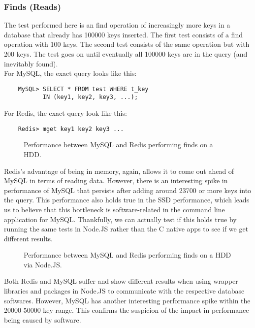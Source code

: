 \documentclass[letterpaper, 10 pt, conference]{ieeeconf}
\begin{document}
\subsubsection{Finds (Reads)}
The test performed here is an find operation of increasingly more keys in a database that already has 100000 keys inserted. The first test consists of a find operation with 100 keys. The second test consists of the same operation but with 200 keys. The test goes on until eventually all 100000 keys are in the query (and inevitably found). \\
For MySQL, the exact query looks like this:
\begin{verbatim}
    MySQL> SELECT * FROM test WHERE t_key
           IN (key1, key2, key3, ...);
\end{verbatim}
For Redis, the exact query look like this:
\begin{verbatim}
    Redis> mget key1 key2 key3 ...
\end{verbatim}
\begin{figure}[h]
    \centering
    
    \caption{Performance between MySQL and Redis performing finds on a HDD.}
    \label{fig:mesh1}
\end{figure}
Redis's advantage of being in memory, again, allows it to come out ahead of MySQL in terms of reading data. However, there is an interesting spike in performance of MySQL that persists after adding around 23700 or more keys into the query. This performance also holds true in the SSD performance, which leads us to believe that this bottleneck is software-related in the command line application for MySQL. Thankfully, we can actually test if this holds true by running the same tests in Node.JS rather than the C native apps to see if we get different results.
\begin{figure}[h]
    \centering
    
    \caption{Performance between MySQL and Redis performing finds on a HDD via Node.JS.}
    \label{fig:mesh1}
\end{figure}
Both Redis and MySQL suffer and show different results when using wrapper libraries and packages in Node.JS to communicate with the respective database softwares. However, MySQL has another interesting performance spike within the 20000-50000 key range. This confirms the suspicion of the impact in performance being caused by software.
\end{document}
